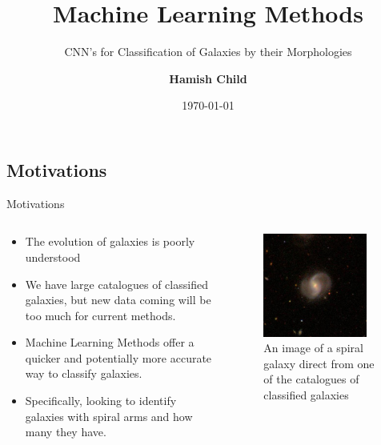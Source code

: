 \documentclass{beamer}
\title
{Machine Learning Methods}
\subtitle{CNN's for Classification of Galaxies by their Morphologies}
\author
{\textbf{Hamish Child} }
\institute[Lancaster University] %
{
  
	Supervisor: Brooke Simmons
}
\date
{\today}
\begin{document}
\begin{frame}
\titlepage
\end{frame}

\subsection{Motivations}
    \begin{frame}{Motivations}
    \begin{columns}
        \begin{column}{0.6\textwidth}
        \begin{block}{}
        \begin{itemize}
            \item The evolution of galaxies is poorly understood
            \item We have large catalogues of classified galaxies, but new data coming will be too much for current methods.
            \item Machine Learning Methods offer a quicker and potentially more accurate way to classify galaxies.
            \item Specifically, looking to identify galaxies with spiral arms and how many they have.
        \end{itemize}
        \end{block}
        \end{column}
        \begin{column}{0.4\textwidth}
        \begin{figure}
            \centering
            \includegraphics[width=0.9\textwidth]{Figures/137506.jpg}
            \caption{An image of a spiral galaxy direct from one of the catalogues of classified galaxies}
            \label{fig:137506}
        \end{figure}
        \end{column}
    \end{columns}
    \end{frame}
\end{document}
